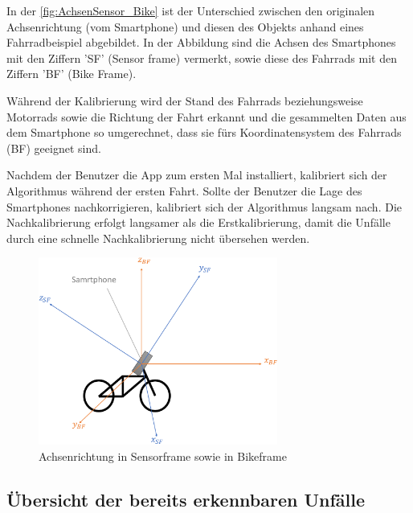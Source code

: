 In der \autoref{fig:AchsenSensor_Bike} ist der Unterschied zwischen den originalen Achsenrichtung (vom Smartphone) und diesen des Objekts anhand eines Fahrradbeispiel abgebildet. In der Abbildung sind die Achsen des Smartphones mit den Ziffern 'SF' (Sensor frame) vermerkt, sowie diese des Fahrrads mit den Ziffern 'BF' (Bike Frame).

Während der Kalibrierung wird der Stand des Fahrrads beziehungsweise Motorrads sowie die Richtung der Fahrt erkannt und die gesammelten Daten aus dem Smartphone so umgerechnet, dass sie fürs Koordinatensystem des Fahrrads (BF) geeignet sind.

Nachdem der Benutzer die App zum ersten Mal installiert, kalibriert sich der Algorithmus während der ersten Fahrt. Sollte der Benutzer die Lage des Smartphones nachkorrigieren, kalibriert sich der Algorithmus langsam nach. Die Nachkalibrierung erfolgt langsamer als die Erstkalibrierung, damit die Unfälle durch eine schnelle Nachkalibrierung nicht übersehen werden.



\begin{figure}
	\centering
	\includegraphics[width=0.7\textwidth]{Bilder/AchsenSensor_Bike_new_.pdf} 
	\caption{Achsenrichtung in Sensorframe sowie in Bikeframe}
	\label{fig:AchsenSensor_Bike}
\end{figure}



\subsection{Übersicht der bereits erkennbaren Unfälle}

%

